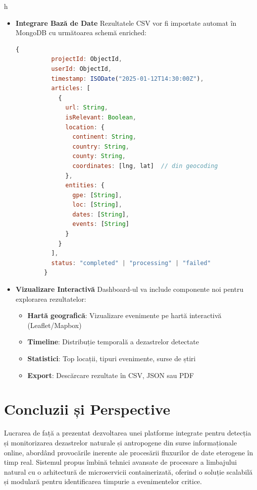 h\documentclass[12pt,a4paper]{article}
\begin{document}
\begin{itemize}
    \item \textbf{Integrare Bază de Date}
        Rezultatele CSV vor fi importate automat în MongoDB cu următoarea schemă enriched:
        \begin{lstlisting}[language=JavaScript, caption={Schema MongoDB pentru rezultate AI}, label={lst:mongodb-schema}, basicstyle=\tiny\ttfamily, allign=center]
        {
          projectId: ObjectId,
          userId: ObjectId,
          timestamp: ISODate("2025-01-12T14:30:00Z"),
          articles: [
            {
              url: String,
              isRelevant: Boolean,
              location: {
                continent: String,
                country: String,
                county: String,
                coordinates: [lng, lat]  // din geocoding
              },
              entities: {
                gpe: [String],
                loc: [String],
                dates: [String],
                events: [String]
              }
            }
          ],
          status: "completed" | "processing" | "failed"
        }
        \end{lstlisting}

        \item \textbf{Vizualizare Interactivă}
        Dashboard-ul va include componente noi pentru explorarea rezultatelor:
        \begin{itemize}
            \item \textbf{Hartă geografică}: Vizualizare evenimente pe hartă interactivă (Leaflet/Mapbox)
            \item \textbf{Timeline}: Distribuție temporală a dezastrelor detectate
            \item \textbf{Statistici}: Top locații, tipuri evenimente, surse de știri
            \item \textbf{Export}: Descărcare rezultate în CSV, JSON sau PDF
        \end{itemize}
\end{itemize}


\section{Concluzii și Perspective}
\label{sec:concluzii}

\hspace{1em} Lucrarea de față a prezentat dezvoltarea unei platforme integrate pentru detecția și monitorizarea dezastrelor naturale și antropogene din surse informaționale online, abordând provocările inerente ale procesării fluxurilor de date eterogene în timp real. Sistemul propus îmbină tehnici avansate de procesare a limbajului natural cu o arhitectură de microservicii containerizată, oferind o soluție scalabilă și modulară pentru identificarea timpurie a evenimentelor critice.
\end{document}
